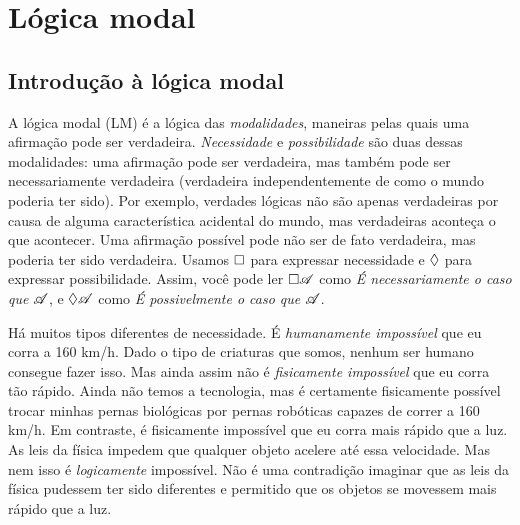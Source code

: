 
\part{Lógica modal}
\label{ch.ML}

\chapter{Introdução à lógica modal}
\label{Intro}

A lógica modal (LM) é a lógica das \emph{modalidades}, maneiras pelas quais uma afirmação pode ser verdadeira. \emph{Necessidade} e \emph{possibilidade} são duas dessas modalidades: uma afirmação pode ser verdadeira, mas também pode ser necessariamente verdadeira (verdadeira independentemente de como o mundo poderia ter sido). Por exemplo, verdades lógicas não são apenas verdadeiras por causa de alguma característica acidental do mundo, mas verdadeiras aconteça o que acontecer. Uma afirmação possível pode não ser de fato verdadeira, mas poderia ter sido verdadeira. Usamos $\Box$ para expressar necessidade e $\Diamond$ para expressar possibilidade. Assim, você pode ler $\Box \mathscr{A}$ como \emph{É necessariamente o caso que} $\mathscr{A}$, e $\Diamond \mathscr{A}$ como \emph{É possivelmente o caso que} $\mathscr{A}$.

Há muitos tipos diferentes de necessidade. É \emph{humanamente impossível} que eu corra a 160 km/h. Dado o tipo de criaturas que somos, nenhum ser humano consegue fazer isso. Mas ainda assim não é \emph{fisicamente impossível} que eu corra tão rápido. Ainda não temos a tecnologia, mas é certamente fisicamente possível trocar minhas pernas biológicas por pernas robóticas capazes de correr a 160 km/h. Em contraste, é fisicamente impossível que eu corra mais rápido que a luz. As leis da física impedem que qualquer objeto acelere até essa velocidade. Mas nem isso é \emph{logicamente} impossível. Não é uma contradição imaginar que as leis da física pudessem ter sido diferentes e permitido que os objetos se movessem mais rápido que a luz.

